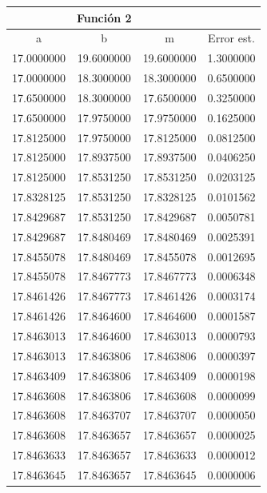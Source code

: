 \documentclass[12pt,a4paper]{article}
\begin{document}
\begin{tabular}{| c | c | c | c |}
\hline
 & Función 2 & &  \\
\hline
a       &             b        &       m        &   Error est.  \\ \hline
 17.0000000  &    19.6000000   &   19.6000000   &   1.3000000 \\     
 17.0000000  &    18.3000000   &   18.3000000   &   0.6500000 \\     
 17.6500000  &    18.3000000   &   17.6500000   &   0.3250000 \\     
 17.6500000  &    17.9750000   &   17.9750000   &   0.1625000 \\     
 17.8125000  &    17.9750000   &   17.8125000   &   0.0812500 \\     
 17.8125000  &    17.8937500   &   17.8937500   &   0.0406250 \\     
 17.8125000  &    17.8531250   &   17.8531250   &   0.0203125 \\     
 17.8328125  &    17.8531250   &   17.8328125   &   0.0101562 \\     
 17.8429687  &    17.8531250   &   17.8429687   &   0.0050781 \\     
 17.8429687  &    17.8480469   &   17.8480469   &   0.0025391 \\     
 17.8455078  &    17.8480469   &   17.8455078   &   0.0012695 \\     
 17.8455078  &    17.8467773   &   17.8467773   &   0.0006348 \\     
 17.8461426  &    17.8467773   &   17.8461426   &   0.0003174 \\     
 17.8461426  &    17.8464600   &   17.8464600   &   0.0001587 \\     
 17.8463013  &    17.8464600   &   17.8463013   &   0.0000793 \\     
 17.8463013  &    17.8463806   &   17.8463806   &   0.0000397 \\     
 17.8463409  &    17.8463806   &   17.8463409   &   0.0000198 \\     
 17.8463608  &    17.8463806   &   17.8463608   &   0.0000099 \\     
 17.8463608  &    17.8463707   &   17.8463707   &   0.0000050 \\     
 17.8463608  &    17.8463657   &   17.8463657   &   0.0000025 \\     
 17.8463633  &    17.8463657   &   17.8463633   &   0.0000012 \\     
 17.8463645  &    17.8463657   &   17.8463645   &   0.0000006 \\ \hline
\end{tabular}
\end{document}

